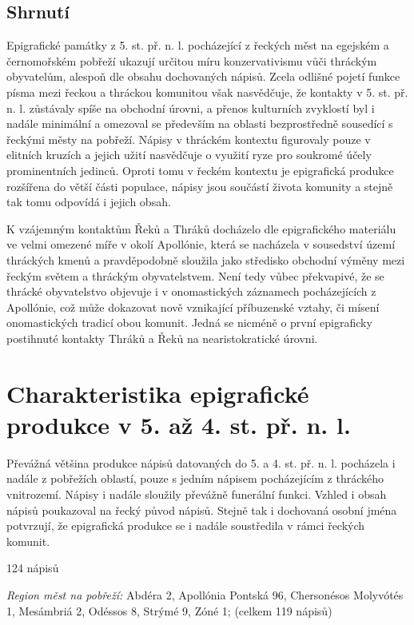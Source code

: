 \subsection[shrnutí-5]{Shrnutí}

Epigrafické památky z 5. st. př. n. l. pocházející z řeckých měst na egejském a černomořském pobřeží ukazují určitou míru konzervativismu vůči thráckým obyvatelům, alespoň dle obsahu dochovaných nápisů. Zcela odlišné pojetí funkce písma mezi řeckou a thráckou komunitou však nasvědčuje, že kontakty v 5. st. př. n. l. zůstávaly spíše na obchodní úrovni, a přenos kulturních zvyklostí byl i nadále minimální a omezoval se především na oblasti bezprostředně sousedící s řeckými městy na pobřeží. Nápisy v thráckém kontextu figurovaly pouze v elitních kruzích a jejich užití nasvědčuje o využití ryze pro soukromé účely prominentních jedinců. Oproti tomu v řeckém kontextu je epigrafická produkce rozšířena do větší části populace, nápisy jsou součástí života komunity a stejně tak tomu odpovídá i jejich obsah.

K vzájemným kontaktům Řeků a Thráků docházelo dle epigrafického materiálu ve velmi omezené míře v okolí Apollónie, která se nacházela v sousedství území thráckých kmenů a pravděpodobně sloužila jako středisko obchodní výměny mezi řeckým světem a thráckým obyvatelstvem. Není tedy vůbec překvapivé, že se thrácké obyvatelstvo objevuje i v onomastických záznamech pocházejících z Apollónie, což může dokazovat nově vznikající příbuzenské vztahy, či mísení onomastických tradicí obou komunit. Jedná se nicméně o první epigraficky postihnuté kontakty Thráků a Řeků na nearistokratické úrovni.

\section[charakteristika-epigrafické-produkce-v-5.-až-4.-st.-př.-n.-l.]{Charakteristika epigrafické produkce v 5. až 4. st. př. n. l.}

Převážná většina produkce nápisů datovaných do 5. a 4. st. př. n. l. pocházela i nadále z pobřežích oblastí, pouze s jedním nápisem pocházejícím z thráckého vnitrozemí. Nápisy i nadále sloužily převážně funerální funkci. Vzhled i obsah nápisů poukazoval na řecký původ nápisů. Stejně tak i dochovaná osobní jména potvrzují, že epigrafická produkce se i nadále soustředila v rámci řeckých komunit.

\placetable[none]{}
\starttable[|l|]
\HL
{} 124 nápisů

{\em Region měst na pobřeží:} Abdéra 2, Apollónia Pontská 96, Chersonésos Molyvótés 1, Mesámbriá 2, Odéssos 8, Strýmé 9, Zóné 1; (celkem 119 nápisů)

